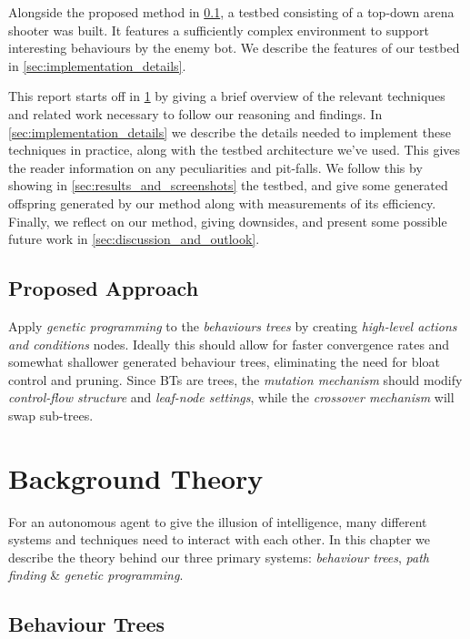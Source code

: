 \documentclass[a4paper, twocolumn]{article}
\begin{document}
    Alongside the proposed method in \cref{sec:proposed_approach}, a testbed consisting of a top-down arena shooter was built. It features a sufficiently complex environment to support interesting behaviours by the enemy bot. We describe the features of our testbed in \cref{sec:implementation_details}.

    This report starts off in \cref{sec:background_theory} by giving a brief overview of the relevant techniques and related work necessary to follow our reasoning and findings. In \cref{sec:implementation_details} we describe the details needed to implement these techniques in practice, along with the testbed architecture we've used. This gives the reader information on any peculiarities and pit-falls. We follow this by showing in \cref{sec:results_and_screenshots} the testbed, and give some generated offspring generated by our method along with measurements of its efficiency. Finally, we reflect on our method, giving downsides, and present some possible future work in \cref{sec:discussion_and_outlook}.

    \vspace{-0.8em}

    \subsection{Proposed Approach} \label{sec:proposed_approach}

    Apply \emph{genetic programming} to the \emph{behaviours trees} by creating \emph{high-level actions and conditions} nodes. Ideally this should allow for faster convergence rates and somewhat shallower generated behaviour trees, eliminating the need for bloat control and pruning. Since BTs are trees, the \emph{mutation mechanism} should modify \emph{control-flow structure} and \emph{leaf-node settings}, while the \emph{crossover mechanism} will swap sub-trees.

    \section{Background Theory} \label{sec:background_theory}

    For an autonomous agent to give the illusion of intelligence, many different systems and techniques need to interact with each other. In this chapter we describe the theory behind our three primary systems: \emph{behaviour trees}, \emph{path finding} \& \emph{genetic programming}.

        \subsection{Behaviour Trees} \label{sec:behaviour_trees}
\end{document}
